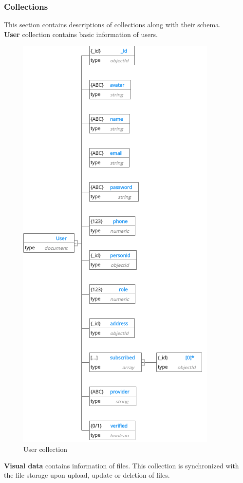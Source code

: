 \subsubsection{Collections}
This section contains descriptions of collections along with their schema.\\

\textbf{User} collection contains basic information of users.
\begin{center}
	\begin{figure}[H]
		\centering
		\includegraphics[width=0.5\columnwidth]{images/chap4/User.png}
		\caption{User collection}
	\end{figure}
\end{center}
\cleardoublepage

\textbf{Visual data} contains information of files. This collection is synchronized with the file storage upon upload, update or deletion of files.

